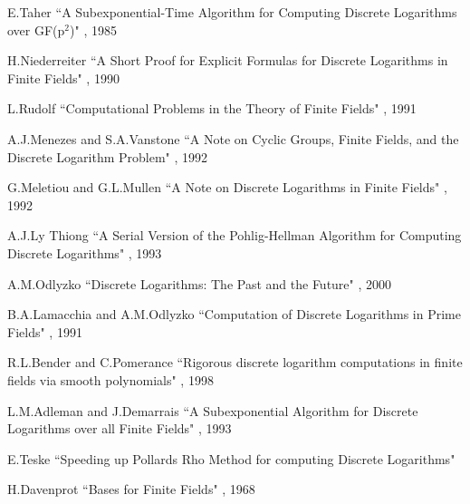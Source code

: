 \documentclass[iwp,first]{luthesis}
\begin{document}
\begin{thebibliography}{33}
 E.Taher
\newblock ``A Subexponential-Time Algorithm for Computing Discrete Logarithms over GF(p$^2$)"
, 1985

 H.Niederreiter
\newblock ``A Short Proof for Explicit Formulas for Discrete Logarithms in Finite Fields"
, 1990

 L.Rudolf
\newblock ``Computational Problems in the Theory of Finite Fields"
, 1991

 A.J.Menezes and S.A.Vanstone
\newblock ``A Note on Cyclic Groups, Finite Fields, and the Discrete Logarithm Problem"
, 1992

 G.Meletiou and G.L.Mullen
\newblock ``A Note on Discrete Logarithms in Finite Fields"
, 1992

 A.J.Ly Thiong
\newblock ``A Serial Version of the Pohlig-Hellman Algorithm for Computing Discrete Logarithms"
, 1993

 A.M.Odlyzko
\newblock ``Discrete Logarithms: The Past and the Future"
, 2000

 B.A.Lamacchia and  A.M.Odlyzko
\newblock ``Computation of Discrete Logarithms in Prime Fields"
, 1991

 R.L.Bender and C.Pomerance
\newblock ``Rigorous discrete logarithm computations in finite fields via smooth polynomials"
, 1998

 L.M.Adleman and J.Demarrais
\newblock ``A Subexponential Algorithm for Discrete Logarithms over all Finite Fields"
, 1993

 E.Teske
\newblock ``Speeding up Pollards Rho Method for computing Discrete Logarithms"

 H.Davenprot
\newblock ``Bases for Finite Fields"
, 1968


\end{thebibliography}
\end{document}
